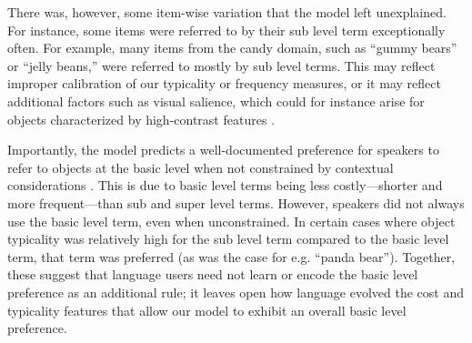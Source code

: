 \documentclass[10pt,letterpaper]{article}
\newcommand{\jd}[1]{\textcolor{Blue}{[jd: #1]}}
\begin{document}
There was, however, some item-wise variation that the model left unexplained. For instance, some items were referred to by their sub level term exceptionally often. For example, many items from the candy domain, such as ``gummy bears'' or ``jelly beans,'' were referred to mostly by sub level terms.
This may reflect improper calibration of our typicality or frequency measures, or it may reflect additional factors such as visual salience, which could for instance arise for objects characterized by high-contrast features \cite{Westerbeek2015}.




Importantly, the model predicts a well-documented preference for speakers  to refer to objects at the basic level when not constrained by contextual considerations  \cite{RoschEtAl76_BasicLevel}. This is due to basic level terms being less costly---shorter and more frequent---than sub and super level terms. However, speakers did not always use the basic level term, even when unconstrained. In certain cases where object typicality was relatively high for the sub level term compared to the basic level term, that term was preferred (as was the case for e.g. ``panda bear''). %
Together, these suggest that language users need not learn or encode the basic level preference as an additional rule; it leaves open how language evolved the cost and typicality features that allow our model to exhibit an overall basic level preference.
\end{document}
